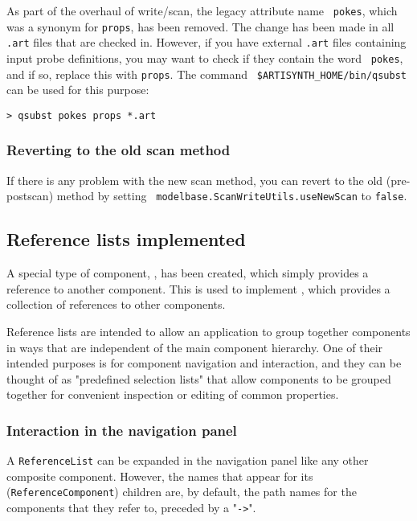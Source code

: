 \documentclass{article}
\begin{document}
As part of the overhaul of write/scan, the legacy attribute name {\tt
pokes}, which was a synonym for {\tt props}, has been removed. The
change has been made in all {\tt .art} files that are checked in.
However, if you have external {\tt .art} files containing input probe
definitions, you may want to check if they contain the word {\tt
pokes}, and if so, replace this with {\tt props}. The command {\tt
\$ARTISYNTH\_HOME/bin/qsubst} can be used for this purpose:
\begin{lstlisting}[]
  > qsubst pokes props *.art
\end{lstlisting}

\subsubsection*{Reverting to the old scan method}

If there is any problem with the new scan method, you can revert to
the old (pre-postscan) method by setting {\tt
modelbase.ScanWriteUtils.useNewScan} to {\tt false}.

\subsection*{Reference lists implemented}

A special type of component, , has been
created, which simply provides a reference to another component.  This
is used to implement , which provides a
collection of references to other components.

Reference lists are intended to allow an application to group together
components in ways that are independent of the main component
hierarchy.  One of their intended purposes is for component navigation
and interaction, and they can be thought of as "predefined selection
lists" that allow components to be grouped together for convenient
inspection or editing of common properties.

\subsubsection*{Interaction in the navigation panel}

A {\tt ReferenceList} can be expanded in the navigation panel like any
other composite component. However, the names that appear for its
({\tt ReferenceComponent}) children are, by default, the path names
for the components that they refer to, preceded by a "{\tt ->}".
\end{document}
